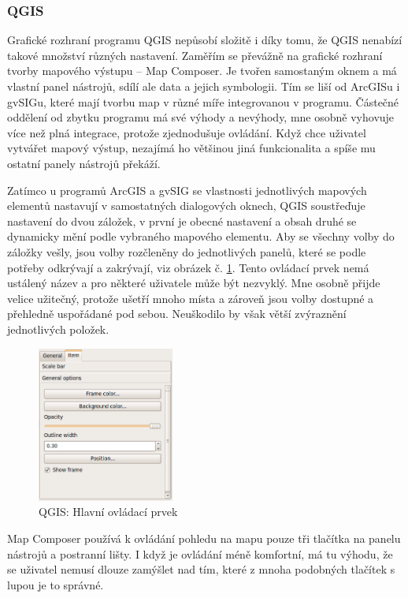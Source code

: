 \documentclass[a4paper,12pt,draft]{article}
\begin{document}
\subsubsection{QGIS}
Grafické rozhraní programu QGIS nepůsobí složitě i díky tomu, že QGIS
nenabízí takové množství různých nastavení. Zaměřím se převážně
na grafické rozhraní tvorby mapového výstupu -- Map Composer. Je tvořen
samostaným oknem a má vlastní panel nástrojů, sdílí ale data a jejich
symbologii. Tím se liší od ArcGISu i gvSIGu, které mají tvorbu map v
různé míře integrovanou v programu. Částečné oddělení od zbytku
programu má své výhody a nevýhody, mne osobně vyhovuje více než
plná integrace, protože zjednodušuje ovládání. Když chce uživatel
vytvářet mapový výstup, nezajímá ho většinou jiná funkcionalita a
spíše mu ostatní panely nástrojů překáží.

Zatímco u programů ArcGIS a gvSIG se vlastnosti jednotlivých mapových
elementů nastavují v samostatných dialogových oknech, QGIS soustřeďuje
nastavení do dvou záložek, v první je obecné nastavení a obsah
druhé se dynamicky mění podle vybraného mapového elementu. Aby se
všechny volby do záložky vešly, jsou volby rozčleněny do jednotlivých
panelů, které se podle potřeby odkrývají a zakrývají, viz obrázek
č. \ref{fig:QGIS_panel}. Tento ovládací prvek nemá ustálený název
a pro některé uživatele může být nezvyklý. Mne osobně přijde
velice užitečný, protože ušetří mnoho místa a zároveň jsou volby
dostupné a přehledně uspořádané pod sebou. Neuškodilo by však větší
zvýraznění jednotlivých položek.


\begin{figure}[h!]
\centering
\includegraphics[width=0.4\textwidth]{./GUI_screenshots/QGIS_panel.png}
\caption{QGIS: Hlavní ovládací prvek}
\label{fig:QGIS_panel}
\end{figure}

Map Composer používá k ovládání pohledu na mapu pouze tři tlačítka
na panelu nástrojů a postranní lišty. I když je ovládání méně
komfortní, má tu výhodu, že se uživatel nemusí dlouze zamýšlet nad
tím, které z mnoha podobných tlačítek s lupou je to správné.
\end{document}
